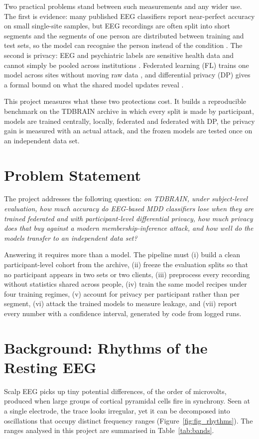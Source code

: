 \documentclass[12pt,a4paper,oneside]{report}
\begin{document}
Two practical problems stand between such measurements and any wider use. The first is evidence: many published EEG classifiers report near-perfect accuracy on small single-site samples, but EEG recordings are often split into short segments and the segments of one person are distributed between training and test sets, so the model can recognise the person instead of the condition \cite{leak}. The second is privacy: EEG and psychiatric labels are sensitive health data and cannot simply be pooled across institutions \cite{kaissis}. Federated learning (FL) trains one model across sites without moving raw data \cite{fedavg}, and differential privacy (DP) gives a formal bound on what the shared model updates reveal \cite{dwork}.

This project measures what these two protections cost. It builds a reproducible benchmark on the TDBRAIN archive \cite{tdbrain} in which every split is made by participant, models are trained centrally, locally, federated and federated with DP, the privacy gain is measured with an actual attack, and the frozen models are tested once on an independent data set.


\section{Problem Statement}
The project addresses the following question: \emph{on TDBRAIN, under subject-level evaluation, how much accuracy do EEG-based MDD classifiers lose when they are trained federated and with participant-level differential privacy, how much privacy does that buy against a modern membership-inference attack, and how well do the models transfer to an independent data set?}

Answering it requires more than a model. The pipeline must (i) build a clean participant-level cohort from the archive, (ii) freeze the evaluation splits so that no participant appears in two sets or two clients, (iii) preprocess every recording without statistics shared across people, (iv) train the same model recipes under four training regimes, (v) account for privacy per participant rather than per segment, (vi) attack the trained models to measure leakage, and (vii) report every number with a confidence interval, generated by code from logged runs.


\section{Background: Rhythms of the Resting EEG}
Scalp EEG picks up tiny potential differences, of the order of microvolts, produced when large groups of cortical pyramidal cells fire in synchrony. Seen at a single electrode, the trace looks irregular, yet it can be decomposed into oscillations that occupy distinct frequency ranges (Figure~\ref{fig:fig_rhythms}). The ranges analysed in this project are summarised in Table~\ref{tab:bands}.
\end{document}
